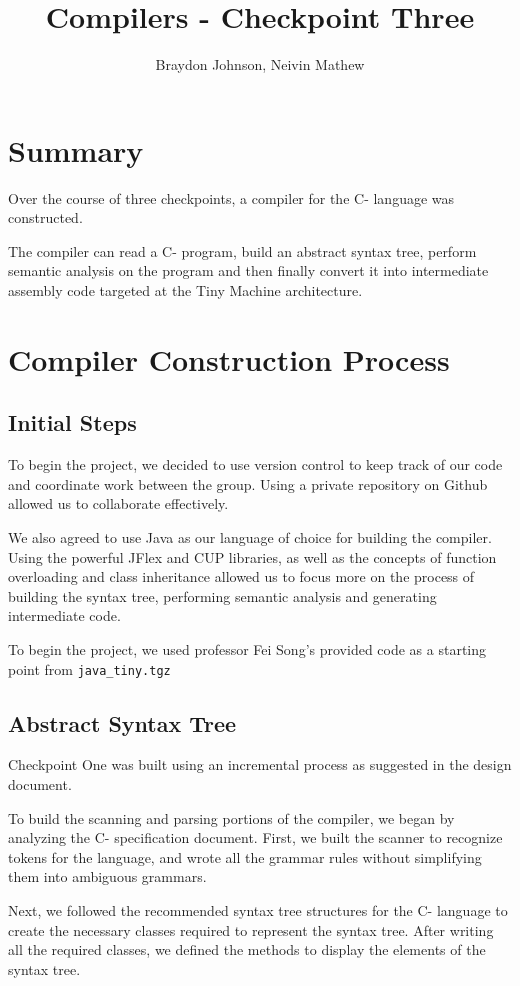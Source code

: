 \documentclass[12pt, letterpaper]{article}
\title{\LARGE{\textbf{Compilers - Checkpoint Three}}}
\author{Braydon Johnson, Neivin Mathew}
\begin{document}
\maketitle

\section{Summary}
Over the course of three checkpoints, a compiler for the C- language was constructed.

The compiler can read a C- program, build an abstract syntax tree, perform semantic analysis on the program and then finally convert it into intermediate assembly code targeted at the Tiny Machine architecture.

\section{Compiler Construction Process}
\subsection{Initial Steps}
To begin the project, we decided to use version control to keep track of our code and coordinate work between the group. Using a private repository on Github allowed us to collaborate effectively.

We also agreed to use Java as our language of choice for building the compiler. Using the powerful JFlex and CUP libraries, as well as the concepts of function overloading and class inheritance allowed us to focus more on the process of building the syntax tree, performing semantic analysis and generating intermediate code.

To begin the project, we used professor Fei Song's provided code as a starting point from \texttt{java\_tiny.tgz}

\subsection{Abstract Syntax Tree}
Checkpoint One was built using an incremental process as suggested in the design document.

To build the scanning and parsing portions of the compiler, we began by analyzing
the C- specification document. First, we built the scanner to recognize tokens for the
language, and wrote all the grammar rules without simplifying them into ambiguous
grammars.

Next, we followed the recommended syntax tree structures for the C- language to
create the necessary classes required to represent the syntax tree. After writing all the
required classes, we defined the methods to display the elements of the syntax tree.
\end{document}
